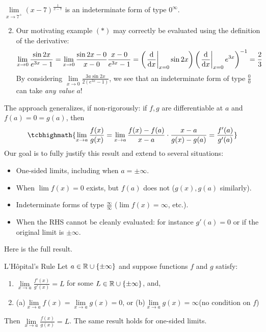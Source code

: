 \begin{examples}{}{}
	\exstart $\lim\limits_{x\to 7^+}(x-7)^\frac 1{x-7}$ is an indeterminate form of type $0^\infty$.
	\begin{enumerate}\setcounter{enumi}{1}
	  \item Our motivating example $(\ast)$ may correctly be evaluated using the definition of the derivative:
		\[
			\lim_{x\to 0}\frac{\sin 2x}{e^{3x}-1}
			=\lim_{x\to 0}\frac{\sin 2x-0}{x-0}\frac{x-0}{e^{3x}-1} 
			=\left(\left.\frac{\mathrm{d} }{\mathrm{d} x}\right|_{x=0}\sin 2x\right) \left(\left.\frac{\mathrm{d} }{\mathrm{d} x}\right|_{x=0}e^{3x}\right)^{-1} 
			=\frac 23
		\]
		By considering $\lim\limits_{x\to 0}\frac{3a\sin 2x}{2(e^{3x}-1)}$, we see that an indeterminate form of type $\frac 00$ can take \emph{any value} $a$!
	\end{enumerate}
\end{examples}

The approach generalizes, if non-rigorously: if $f,g$ are differentiable at $a$ and $f(a)=0=g(a)$, then
\[
	\tcbhighmath{%
		\lim_{x\to a}\frac{f(x)}{g(x)}
		=\lim_{x\to a}\frac{f(x)-f(a)}{x-a}\cdot \frac{x-a}{g(x)-g(a)} 
		=\frac{f'(a)}{g'(a)}
	}
\]
Our goal is to fully justify this result and extend to several situations:
\begin{itemize}\itemsep2pt
  \item One-sided limits, including when $a=\pm\infty$.
  \item When $\lim f(x)=0$ exists, but $f(a)$ does not ($g(x),g(a)$ similarly).
  \item Indeterminate forms of type $\frac\infty\infty$ ($\lim f(x)=\infty$, etc.).
  \item When the RHS cannot be cleanly evaluated: for instance $g'(a)=0$ or if the original limit is $\pm\infty$.
\end{itemize}

Here is the full result.

\begin{thm}{L'Hôpital's Rule}{}
	Let $a\in\mathbb{R}\cup\{\pm\infty\}$ and suppose functions $f$ and $g$ satisfy:
	\begin{enumerate}
	  \item $\lim\limits_{x\to a}\frac{f'(x)}{g'(x)}=L$ for some $L\in\mathbb{R}\cup\{\pm\infty\}$, \space and,
	  \item (a)\space\space $\lim\limits_{x\to a}f(x)=\lim\limits_{x\to a} g(x)=0$,
	  \quad or\quad 
	  (b)\space\space $\lim\limits_{x\to a}g(x)=\infty$\space\space (no condition on $f$)
	\end{enumerate}
	Then $\lim\limits_{x\to a}\frac{f(x)}{g(x)}=L$. The same result holds for one-sided limits.
\end{thm}


